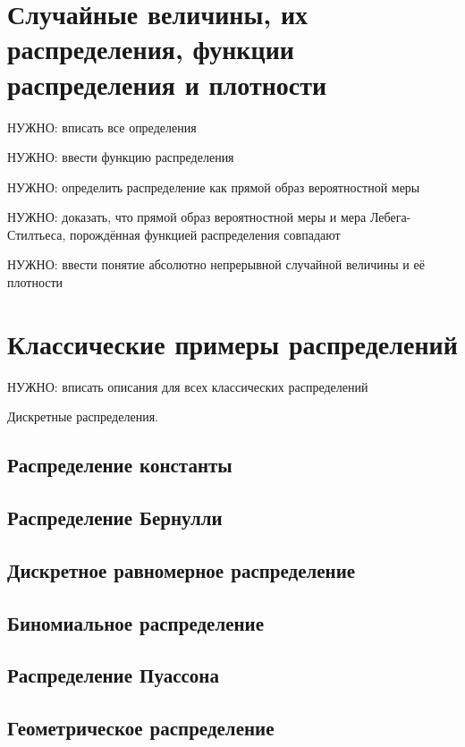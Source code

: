 \documentclass[12pt]{article}
\numberwithin{theorem}{section}
\numberwithin{proposition}{section}
\theoremstyle{definition}
\newcommand{\TODO}[1]{\textcolor{todocolor}{НУЖНО: #1}}
\begin{document}
	\section{Случайные величины, их распределения, функции распределения и плотности}
	
	\TODO{вписать все определения}
	
	\TODO{ввести функцию распределения}
	
	\TODO{определить распределение как прямой образ вероятностной меры}
	
	\TODO{доказать, что прямой образ вероятностной меры и мера Лебега-Стилтьеса, порождённая функцией распределения совпадают}
	
	\TODO{ввести понятие абсолютно непрерывной случайной величины и её плотности}
	
	\section{Классические примеры распределений} 
	
	\TODO{вписать описания для всех классических распределений}
	
	Дискретные распределения.
	
	\subsection{Распределение константы}
	
	\subsection{Распределение Бернулли}
	
	\subsection{Дискретное равномерное распределение}
	
	\subsection{Биномиальное распределение}
	
	\subsection{Распределение Пуассона}
	
	\subsection{Геометрическое распределение}
	
\end{document}
